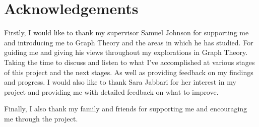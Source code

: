\chapter*{Acknowledgements}
Firstly, I would like to thank my supervisor Samuel Johnson for supporting me and introducing me to Graph Theory and the areas in which he has studied. For guiding me and giving his views throughout my explorations in Graph Theory. Taking the time to discuss and listen to what I've accomplished at various stages of this project and the next stages. As well as providing feedback on my findings and progress. I would also like to thank Sara Jabbari for her interest in my project and providing me with detailed feedback on what to improve.

Finally, I also thank my family and friends for supporting me and encouraging me through the project.

